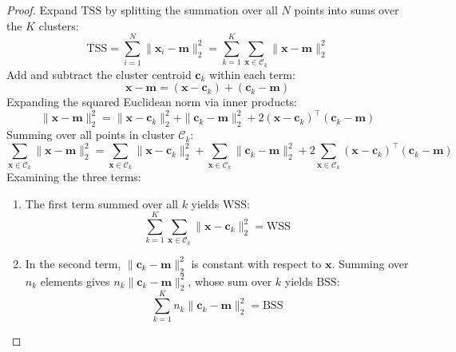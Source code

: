 \begin{proof}
Expand $\mathrm{TSS}$ by splitting the summation over all $N$ points into sums over the $K$ clusters:
\begin{equation}
\mathrm{TSS} = \sum_{i=1}^N \|\mathbf{x}_i - \mathbf{m}\|_2^2 = \sum_{k=1}^K \sum_{\mathbf{x} \in \mathcal{C}_k} \|\mathbf{x} - \mathbf{m}\|_2^2
\end{equation}
Add and subtract the cluster centroid $\mathbf{c}_k$ within each term:
\begin{equation}
\mathbf{x} - \mathbf{m} = (\mathbf{x} - \mathbf{c}_k) + (\mathbf{c}_k - \mathbf{m})
\end{equation}
Expanding the squared Euclidean norm via inner products:
\begin{equation}
\|\mathbf{x} - \mathbf{m}\|_2^2 = \|\mathbf{x} - \mathbf{c}_k\|_2^2 + \|\mathbf{c}_k - \mathbf{m}\|_2^2 + 2 (\mathbf{x} - \mathbf{c}_k)^\top (\mathbf{c}_k - \mathbf{m})
\end{equation}
Summing over all points in cluster $\mathcal{C}_k$:
\begin{equation}
\sum_{\mathbf{x} \in \mathcal{C}_k} \|\mathbf{x} - \mathbf{m}\|_2^2 = \sum_{\mathbf{x} \in \mathcal{C}_k} \|\mathbf{x} - \mathbf{c}_k\|_2^2 + \sum_{\mathbf{x} \in \mathcal{C}_k} \|\mathbf{c}_k - \mathbf{m}\|_2^2 + 2 \sum_{\mathbf{x} \in \mathcal{C}_k} (\mathbf{x} - \mathbf{c}_k)^\top (\mathbf{c}_k - \mathbf{m})
\end{equation}
Examining the three terms:
\begin{enumerate}
    \item The first term summed over all $k$ yields $\mathrm{WSS}$:
    \begin{equation}
    \sum_{k=1}^K \sum_{\mathbf{x} \in \mathcal{C}_k} \|\mathbf{x} - \mathbf{c}_k\|_2^2 = \mathrm{WSS}
    \end{equation}
    
    \item In the second term, $\|\mathbf{c}_k - \mathbf{m}\|_2^2$ is constant with respect to $\mathbf{x}$. Summing over $n_k$ elements gives $n_k \|\mathbf{c}_k - \mathbf{m}\|_2^2$, whose sum over $k$ yields $\mathrm{BSS}$:
    \begin{equation}
    \sum_{k=1}^K n_k \|\mathbf{c}_k - \mathbf{m}\|_2^2 = \mathrm{BSS}
    \end{equation}
    

\end{enumerate}
\end{proof}
